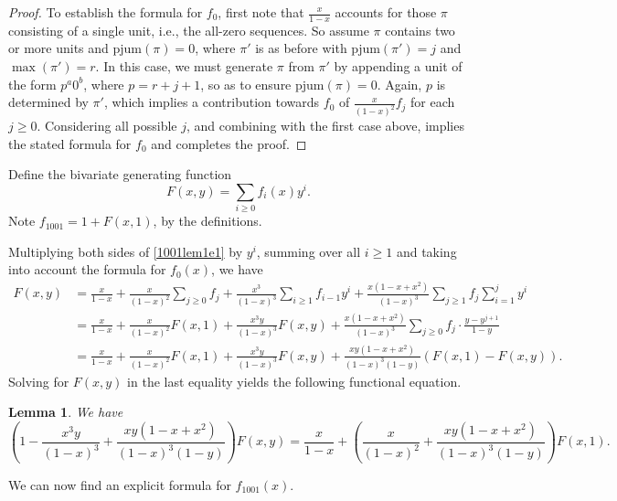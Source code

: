 \documentclass{article}
\theoremstyle{remark}
\theoremstyle{plain}
\newtheorem{lemma}[theorem]{Lemma}
\begin{document}
\begin{proof}
To establish the formula for $f_0$, first note that $\frac{x}{1-x}$ accounts for those $\pi$ consisting of a single unit, i.e., the all-zero sequences.  So assume $\pi$ contains two or more units and $\text{pjum}(\pi)=0$, where $\pi'$ is as before with $\text{pjum}(\pi')=j$ and $\max(\pi')=r$.  In this case, we must generate $\pi$ from $\pi'$ by appending a unit of the form $p^a0^b$, where $p=r+j+1$, so as to ensure $\text{pjum}(\pi)=0$.  Again, $p$ is determined by $\pi'$, which implies a contribution towards $f_0$ of $\frac{x}{(1-x)^2}f_j$ for each $j \geq0$.  Considering all possible $j$, and combining with the first case above, implies the stated formula for $f_0$ and completes the proof.
\end{proof}

Define the bivariate generating function
$$F(x,y)=\sum_{i\geq0}f_i(x)y^i.$$
Note $f_{1001}=1+F(x,1)$, by the definitions.

Multiplying both sides of \eqref{1001lem1e1} by $y^i$, summing over all $i \geq 1$ and taking into account the formula for $f_0(x)$, we have
\begin{align*}
F(x,y)&=\frac{x}{1-x}+\frac{x}{(1-x)^2}\sum_{j\geq0}f_j+\frac{x^3}{(1-x)^3}\sum_{i\geq1}f_{i-1}y^i+\frac{x(1-x+x^2)}{(1-x)^3}\sum_{j\geq1}f_j\sum_{i=1}^jy^i\\
&=\frac{x}{1-x}+\frac{x}{(1-x)^2}F(x,1)+\frac{x^3y}{(1-x)^3}F(x,y)+\frac{x(1-x+x^2)}{(1-x)^3}\sum_{j\geq0}f_j\cdot\frac{y-y^{j+1}}{1-y}\\
&=\frac{x}{1-x}+\frac{x}{(1-x)^2}F(x,1)+\frac{x^3y}{(1-x)^3}F(x,y)+\frac{xy(1-x+x^2)}{(1-x)^3(1-y)}(F(x,1)-F(x,y)).
\end{align*}
Solving for $F(x,y)$ in the last equality yields the following functional equation.

\begin{lemma}\label{1001lem2}
We have
\begin{equation}\label{1001lem2e1}
\left(1-\frac{x^3y}{(1-x)^3}+\frac{xy(1-x+x^2)}{(1-x)^3(1-y)}\right)F(x,y)=\frac{x}{1-x}+\left(\frac{x}{(1-x)^2}+\frac{xy(1-x+x^2)}{(1-x)^3(1-y)}\right)F(x,1).
\end{equation}
\end{lemma}

We can now find an explicit formula for $f_{1001}(x)$.
\end{document}
